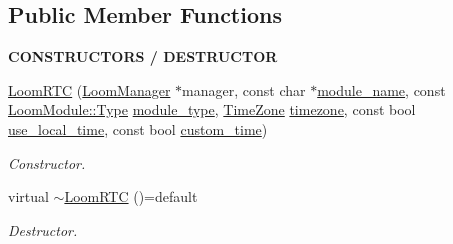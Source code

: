 \subsection*{Public Member Functions}
\begin{Indent}{\bf C\+O\+N\+S\+T\+R\+U\+C\+T\+O\+RS / D\+E\+S\+T\+R\+U\+C\+T\+OR}\par
\begin{DoxyCompactItemize}
\item 
\hyperlink{class_loom_r_t_c_a90ad338511d471757658aa0bff019575}{Loom\+R\+TC} (\hyperlink{class_loom_manager}{Loom\+Manager} $\ast$manager, const char $\ast$\hyperlink{class_loom_module_adf6e68ad7e9fa2acfca7a8a280680764}{module\+\_\+name}, const \hyperlink{class_loom_module_aee91d0a75140d51ee428fc2d4417d865}{Loom\+Module\+::\+Type} \hyperlink{class_loom_module_a152d394f37236a2b159dae19da67eeb0}{module\+\_\+type}, \hyperlink{class_loom_r_t_c_a103a9db94b031555185bbce688d2527a}{Time\+Zone} \hyperlink{class_loom_r_t_c_a6c1336bf000fd9a385f315d43bbbc5b0}{timezone}, const bool \hyperlink{class_loom_r_t_c_a5783620e9af8eb5fa0818aa189483d8e}{use\+\_\+local\+\_\+time}, const bool \hyperlink{class_loom_r_t_c_a91c96be6cc3f0f0f4dedbb038f164e73}{custom\+\_\+time})
\begin{DoxyCompactList}\small\item\em Constructor. \end{DoxyCompactList}\item 
virtual \hyperlink{class_loom_r_t_c_a3077c3988808e9a57605e7c9842114c7}{$\sim$\+Loom\+R\+TC} ()=default
\begin{DoxyCompactList}\small\item\em Destructor. \end{DoxyCompactList}\end{DoxyCompactItemize}
\end{Indent}
